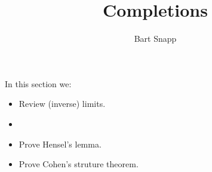\documentclass{ximera}
\author{Bart Snapp}
\title{Completions}
\begin{document}
\begin{abstract}
\end{abstract}
\maketitle
In this section we:

\begin{itemize}
\item Review (inverse) limits.
\item 
\item Prove Hensel's lemma.
\item Prove Cohen's struture theorem.
\end{itemize}
\end{document}
